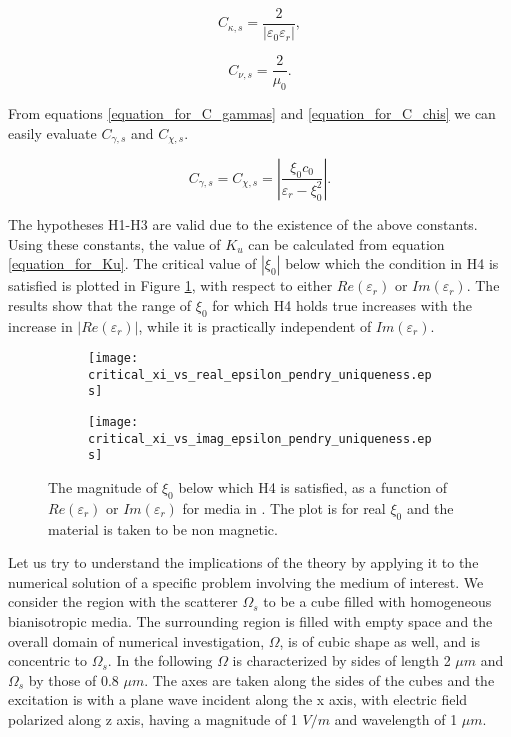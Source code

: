 \begin{equation} \label{eq:cks_pendry}
C_{\kappa,s} =  \frac{2}{|\varepsilon_0\varepsilon_r|},
\end{equation}

\begin{equation} \label{eq:cnus_pendry}
C_{\nu,s} = \frac{2}{\mu_0}. 
\end{equation}

From equations \eqref{equation_for_C_gammas} and \eqref{equation_for_C_chis} 
we can easily evaluate $C_{\gamma,s}$ and $C_{\chi,s}$. 

\begin{equation}
C_{\gamma,s} =  C_{\chi,s} = |\frac{\xi_0c_0}{\varepsilon_r - \xi_0^2}|. 
\end{equation}

The hypotheses H1-H3 are valid due to the existence of the above constants.
Using these constants, the value of $K_u$  can be calculated from equation \eqref{equation_for_Ku}.
The critical value of $|\xi_0|$ below which the condition in H4 is satisfied is plotted in Figure \ref{fi:critical_xi_vs_epsilonr_uniqueness}, 
with respect to either $Re(\varepsilon_r)$ or $Im(\varepsilon_r)$.
The results show that the range of $\xi_0$ for which H4 holds true increases with the increase in $|Re(\varepsilon_r)|$, 
while it is practically independent of $Im(\varepsilon_r)$.

\begin{figure}[H]
\centering
\begin{subfigure}[b]{0.49\textwidth}
\texttt{[image: critical\_xi\_vs\_real\_epsilon\_pendry\_uniqueness.eps]}
\end{subfigure}
%
\begin{subfigure}[b]{0.49\textwidth}
\centering
\texttt{[image: critical\_xi\_vs\_imag\_epsilon\_pendry\_uniqueness.eps]}
\end{subfigure}
\caption{The magnitude of $\xi_0$ below which H4 is satisfied, as a function of $Re(\varepsilon_r)$ or $Im(\varepsilon_r)$ for media in \cite{pendry2016acsphotonics}.
The plot is for real $\xi_0$ and the material is taken to be non magnetic.}
\label{fi:critical_xi_vs_epsilonr_uniqueness}
\end{figure}

Let us try to understand the implications of the theory by applying it to 
the numerical solution of a specific problem involving the medium of interest.
We consider the region with the scatterer $\Omega_{s}$ to be a cube filled 
with homogeneous bianisotropic media.
The surrounding region is filled with empty space and the overall domain 
of numerical investigation, $\Omega$, is of cubic shape as well, and is 
concentric to $\Omega_{s}$.
In the following $\Omega$ is characterized by sides of length 2 $\mu m$ 
and $\Omega_s$ by those of 0.8 $\mu m$.
The axes are taken along the sides of the cubes and the excitation is 
with a plane wave incident along the x axis, with electric field polarized along 
z axis, having a magnitude of 1 $V/m$ and wavelength of 1 $\mu m$.

